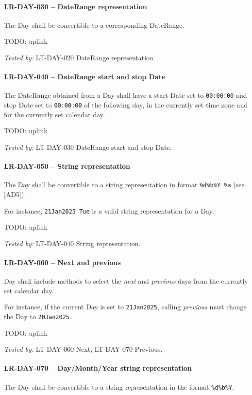 \paragraph{LR-DAY-030 -- DateRange representation}
The Day shall be convertible to a corresponding DateRange.

TODO: uplink

\textit{Tested by: } LT-DAY-020 DateRange representation.

\paragraph{LR-DAY-040 -- DateRange start and stop Date}
The DateRange obtained from a Day shall have a start Date set
to \lstinline{00:00:00} and stop Date set to \lstinline{00:00:00} of the
following day, in the currently set time zone and for the currently set calendar
day.

TODO: uplink

\textit{Tested by: } LT-DAY-030 DateRange start and stop Date.

\paragraph{LR-DAY-050 -- String representation}
The Day shall be convertible to a string representation in format
\lstinline{%d%b%Y %a} (see [AD5]).

For instance, \lstinline{21Jan2025 Tue} is a valid string representation
for a Day.

TODO: uplink

\textit{Tested by: } LT-DAY-040 String representation.

\paragraph{LR-DAY-060 -- Next and previous}
Day shall include methods to select the \emph{next} and \emph{previous} days
from the currently set calendar day.

For instance, if the current Day is set to \lstinline{21Jan2025}, calling
\emph{previous} must change the Day to \lstinline{20Jan2025}.

TODO: uplink

\textit{Tested by: } LT-DAY-060 Next, LT-DAY-070 Previous.

\paragraph{LR-DAY-070 -- Day/Month/Year string representation}
The Day shall be convertible to a string representation in the format
\lstinline{%d%b%Y}.


